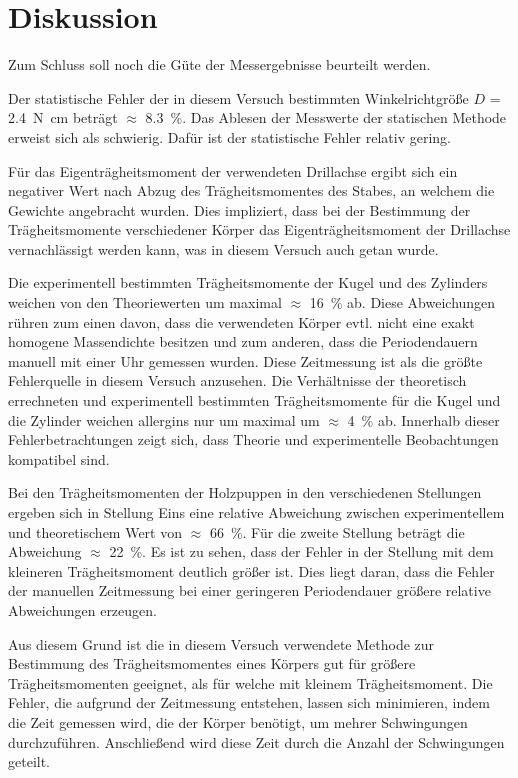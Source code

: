 
\section{Diskussion}
Zum Schluss soll noch die Güte der Messergebnisse beurteilt werden.

Der statistische Fehler der in diesem Versuch bestimmten Winkelrichtgröße 
$D$ = \SI{2.4}{\newton\centi\metre} beträgt $\approx$ \SI{8.3}{\percent}.
Das Ablesen der Messwerte der statischen Methode erweist sich als 
schwierig. Dafür ist der statistische Fehler relativ gering. 

Für das Eigenträgheitsmoment der verwendeten Drillachse ergibt sich 
ein negativer Wert nach Abzug des Trägheitsmomentes des Stabes, 
an welchem die Gewichte angebracht wurden. Dies impliziert, dass 
bei der Bestimmung der Trägheitsmomente verschiedener Körper 
das Eigenträgheitsmoment der Drillachse vernachlässigt werden kann,
 was in diesem Versuch auch getan wurde.

Die experimentell bestimmten Trägheitsmomente der Kugel und des 
Zylinders weichen von den Theoriewerten um maximal $\approx$ 
\SI{16}{\percent} ab. Diese Abweichungen rühren zum einen davon, 
dass die verwendeten Körper evtl. nicht eine exakt homogene 
Massendichte besitzen und zum anderen, dass die Periodendauern 
manuell mit einer Uhr gemessen wurden. Diese Zeitmessung ist als 
die größte Fehlerquelle in diesem Versuch anzusehen.
Die Verhältnisse der theoretisch errechneten und experimentell 
bestimmten Trägheitsmomente für die Kugel und die Zylinder 
weichen allergins nur um maximal um $\approx$ \SI{4}{\percent} ab.
Innerhalb dieser Fehlerbetrachtungen zeigt sich, dass Theorie 
und experimentelle Beobachtungen kompatibel sind.

Bei den Trägheitsmomenten der Holzpuppen in den verschiedenen 
Stellungen ergeben sich in Stellung Eins eine relative Abweichung 
zwischen experimentellem und theoretischem Wert von $\approx$ 
\SI{66}{\percent}. Für die zweite Stellung beträgt die Abweichung 
$\approx$ \SI{22}{\percent}.
Es ist zu sehen, dass der Fehler in der Stellung mit dem kleineren 
Trägheitsmoment deutlich größer ist. Dies liegt daran, dass die 
Fehler der manuellen Zeitmessung bei einer geringeren 
Periodendauer größere relative Abweichungen erzeugen.

Aus diesem Grund ist die in diesem Versuch verwendete Methode 
zur Bestimmung des Trägheitsmomentes eines Körpers gut für 
 größere Trägheitsmomenten geeignet, als für welche 
mit kleinem Trägheitsmoment.
Die Fehler, die aufgrund der Zeitmessung entstehen, lassen sich 
minimieren, indem die Zeit gemessen wird, die der Körper benötigt, 
um mehrer Schwingungen durchzuführen. Anschließend wird diese Zeit 
durch die Anzahl der Schwingungen geteilt.